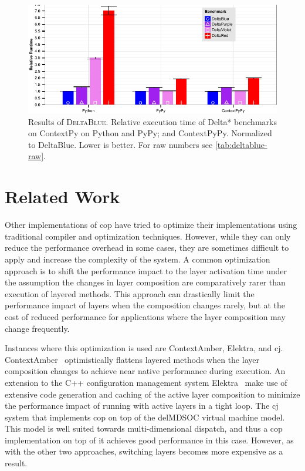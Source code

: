 \documentclass[preprint,english,10pt,nonatbib]{sigplanconf}
\DeclareRobustCommand*\deltablue{\textsc{DeltaBlue}\xspace}
\begin{document}
\begin{figure}
  \centering
  \includegraphics[width=.7\linewidth]{bench/DeltaBlue-norm.pdf}
  \caption{Results of \deltablue. Relative execution time of Delta* benchmarks
    on ContextPy on Python and PyPy; and ContextPyPy. Normalized to DeltaBlue.
    Lower is better. For raw numbers see \autoref{tab:deltablue-raw}.}
\end{figure}



\section{Related Work}

Other implementations of \acrlong{cop} have tried to optimize their
implementations using traditional compiler and optimization techniques. However,
while they can only reduce the performance overhead in some cases, they are
sometimes difficult to apply and increase the complexity of the system. A common
optimization approach is to shift the performance impact to the layer activation
time under the assumption the changes in layer composition are comparatively
rarer than execution of layered methods. This approach can drastically limit the
performance impact of layers when the composition changes rarely, but at the
cost of reduced performance for applications where the layer composition may
change frequently.

Instances where this optimization is used are ContextAmber, Elektra, and
cj. ContextAmber~\cite{springer2015efficient} optimistically flattens layered
methods when the layer composition changes to achieve near native performance
during execution. An extension to the C++ configuration management system
Elektra~\cite{Raab:2014:PEE:2637066.2637074} make use of extensive code
generation and caching of the active layer composition to minimize the
performance impact of running with active layers in a tight loop. The
cj\cite{schippers2009implementation,schippers2008delegation} system that
implements \ac{cop} on top of the delMDSOC virtual machine model. This model is
well suited towards multi-dimensional dispatch, and thus a \ac{cop}
implementation on top of it achieves good performance in this case. However, as
with the other two approaches, switching layers becomes more expensive as a
result.
\end{document}
